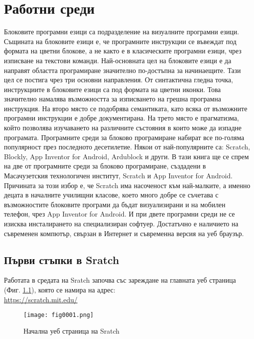 ﻿\chapter{Работни среди}

Блоковите програмни езици са подразделение на визуалните програмни езици. Същината на блоковите езици е, че програмните инструкции се въвеждат под формата на цветни блокове, а не както е в класическите програмни езици, чрез изписване на текстови команди. Най-основната цел на блоковите езици е да направят областта програмиране значително по-достъпна за начинаещите. Тази цел се постига чрез три основни направления. От синтактична гледна точка, инструкциите в блоковите езици са под формата на цветни иконки. Това значително намалява възможността за изписването на грешна програмна инструкция. На второ място се подобрява семантиката, като всяка от възможните програмни инструкции е добре документирана. На трето място е прагматизма, който позволява изучаването на различните състояния в които може да изпадне програмата. Програмните среди за блоково програмиране набират все по-голяма популярност през последното десетилетие. Някои от най-популярните са: Scratch, Blockly, App Inventor for Android, Ardublock и други. В тази книга ще се спрем на две от програмните среди за блоково програмиране, създадени в Масачузетския технологичен институт, Scratch и App Inventor for Android. Причината за този избор е, че Scratch има насоченост към най-малките, а именно децата в началните училищни класове, което много добре се съчетава с възможностите блоковите програми да бъдат визуализирани и на мобилен телефон, чрез App Inventor for Android. И при двете програмни среди не се изисква инсталирането на специализиран софтуер. Достатъчно е наличието на съвременен компютър, свързан в Интернет и съвременна версия на уеб браузър. 

\section{Първи стъпки в Sratch}

Работата в средата на Sratch започва със зареждане на главната уеб страница (Фиг. \ref{fig0001}), която се намира на адрес: \\ \href{https://scratch.mit.edu/}{https://scratch.mit.edu/}

\begin{figure}[H]
  \centering
  \texttt{[image: fig0001.png]}
  \caption{Начална уеб страница на Sratch}
\label{fig0001}
\end{figure}

